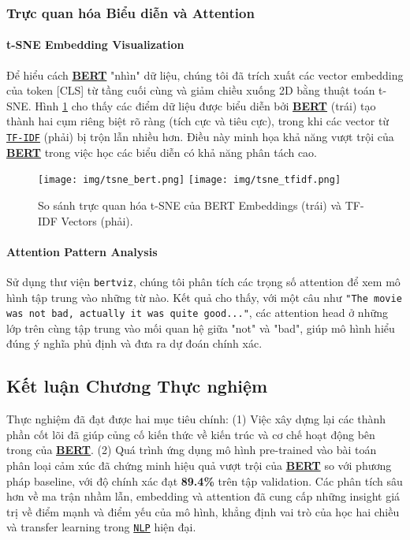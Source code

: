 \subsubsection{Trực quan hóa Biểu diễn và Attention}
\paragraph{t-SNE Embedding Visualization}
Để hiểu cách \hyperref[acro:bert]{\textbf{BERT}} "nhìn" dữ liệu, chúng tôi đã trích xuất các vector embedding của token [CLS] từ tầng cuối cùng và giảm chiều xuống 2D bằng thuật toán t-SNE. Hình \ref{fig:tsne_comparison_app} cho thấy các điểm dữ liệu được biểu diễn bởi \hyperref[acro:bert]{\textbf{BERT}} (trái) tạo thành hai cụm riêng biệt rõ ràng (tích cực và tiêu cực), trong khi các vector từ \hyperref[acro:tfidf]{\texttt{TF-IDF}} (phải) bị trộn lẫn nhiều hơn. Điều này minh họa khả năng vượt trội của \hyperref[acro:bert]{\textbf{BERT}} trong việc học các biểu diễn có khả năng phân tách cao.

\begin{figure}[H]
    \centering
    \texttt{[image: img/tsne\_bert.png]}
    \texttt{[image: img/tsne\_tfidf.png]}
    \caption{So sánh trực quan hóa t-SNE của BERT Embeddings (trái) và TF-IDF Vectors (phải).}
    \label{fig:tsne_comparison_app}
\end{figure}

\paragraph{Attention Pattern Analysis}
Sử dụng thư viện \texttt{bertviz}, chúng tôi phân tích các trọng số attention để xem mô hình tập trung vào những từ nào. Kết quả cho thấy, với một câu như \texttt{"The movie was not bad, actually it was quite good..."}, các attention head ở những lớp trên cùng tập trung vào mối quan hệ giữa "not" và "bad", giúp mô hình hiểu đúng ý nghĩa phủ định và đưa ra dự đoán chính xác.

\subsection{Kết luận Chương Thực nghiệm}
\label{ssec:ket_luan_chuong_thuc_nghiem}
Thực nghiệm đã đạt được hai mục tiêu chính: (1) Việc xây dựng lại các thành phần cốt lõi đã giúp củng cố kiến thức về kiến trúc và cơ chế hoạt động bên trong của \hyperref[acro:bert]{\textbf{BERT}}. (2) Quá trình ứng dụng mô hình pre-trained vào bài toán phân loại cảm xúc đã chứng minh hiệu quả vượt trội của \hyperref[acro:bert]{\textbf{BERT}} so với phương pháp baseline, với độ chính xác đạt \textbf{89.4\%} trên tập validation. Các phân tích sâu hơn về ma trận nhầm lẫn, embedding và attention đã cung cấp những insight giá trị về điểm mạnh và điểm yếu của mô hình, khẳng định vai trò của học hai chiều và transfer learning trong \hyperref[acro:nlp]{\texttt{NLP}} hiện đại.

